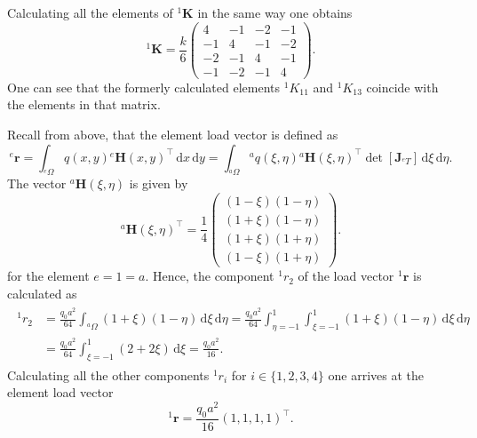 \documentclass[a4paper,11pt]{article}
\numberwithin{equation}{section}
\newcommand\matr[1]{\ensuremath{\boldsymbol{\mathbf{#1}}}}
\newcommand\vect[1]{\ensuremath{\bm{#1}}}
\begin{document}
{\begin{align}
\begin{aligned}
	\end{aligned}
\end{align} Calculating all the elements of ${}^1 \matr{K}$ in the same way one obtains \begin{equation}
	{}^1 \matr{K} = \frac{k}{6}\begin{pmatrix}
		4 & -1 & -2 & -1 \\
		-1 & 4 & -1 & -2 \\
		-2 & -1 & 4 & -1 \\
		-1 & -2 & -1 & 4
	\end{pmatrix}.
\end{equation} One can see that the formerly calculated elements ${}^1 K_{11}$ and ${}^1 K_{13}$ coincide with the elements in that matrix.

Recall from above, that the element load vector is defined as \begin{equation}
	{}^e \vect{r} = \int_{{}^e \Omega} q(x,y) {}^e\vect{H}(x,y)^\top \,\mathrm{d}x\,\mathrm{d}y = \int_{{}^a\Omega} {}^a q(\xi,\eta) {}^a\vect{H}(\xi,\eta)^\top \det\left[\matr{J}_{{}^e T}\right] \,\mathrm{d}\xi\,\mathrm{d}\eta.
\end{equation} The vector ${}^ a \vect{H}(\xi,\eta)$ is given by \begin{equation}
	{}^a\vect{H}(\xi,\eta)^\top = \frac{1}{4}\begin{pmatrix}
		(1-\xi)(1-\eta) \\
		(1+\xi)(1-\eta) \\
		(1+\xi)(1+\eta) \\
		(1-\xi)(1+\eta)
	\end{pmatrix}.
\end{equation} for the element $e=1=a$. Hence, the component ${}^1 r_2$ of the load vector ${}^1 \vect{r}$ is calculated as \begin{align}
	\begin{aligned}
		{}^1 r_2 &= \frac{q_0a^2}{64}\int_{{}^a\Omega}  (1+\xi)(1-\eta)\,\mathrm{d}\xi\,\mathrm{d}\eta = \frac{q_0a^2}{64}\int_{\eta=-1}^1 \int_{\xi=-1}^{1}  (1+\xi)(1-\eta)\,\mathrm{d}\xi\,\mathrm{d}\eta \\
		&= \frac{q_0 a^2}{64}\int_{\xi=-1}^1 (2+2\xi)\,\mathrm{d}\xi = \frac{q_0a^2}{16}.
	\end{aligned}
\end{align} Calculating all the other components ${}^1 r_i$ for $i \in \{1,2,3,4\}$ one arrives at the element load vector \begin{equation}
	{}^1\vect{r} = \frac{q_0 a^2}{16}(1,1,1,1)^\top.
\end{equation}

}
\end{document}
